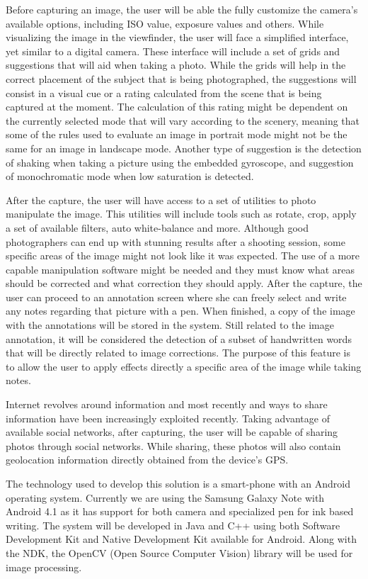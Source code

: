 Before capturing an image, the user will be able the fully customize the camera's available options, including ISO value, exposure values and others. While visualizing the image in the viewfinder, the user will face a simplified interface, yet similar to a digital camera. 
These interface will include a set of grids and suggestions that will aid when taking a photo. While the grids will help in the correct placement of the subject that is being photographed, the suggestions will consist in a visual cue or a rating calculated from the scene that is being captured at the moment. 
The calculation of this rating might be dependent on the currently selected mode that will vary according to the scenery, meaning that some of the rules used to evaluate an image in portrait mode might not be the same for an image in landscape mode. Another type of suggestion is the detection of shaking when taking a picture using the embedded gyroscope, and suggestion of monochromatic mode when low saturation is detected.

After the capture, the user will have access to a set of utilities to photo manipulate the image. This utilities will include tools such as rotate, crop, apply a set of available filters, auto white-balance and  more.
Although good photographers can end up with stunning results after a shooting session, some specific areas of the image might not look like it was expected. The use of a more capable manipulation software might be needed and they must know what areas should be corrected and what correction they should apply. After the capture, the user can proceed to an annotation screen where she can freely select and write any notes regarding that picture with a pen. When finished, a copy of the image with the annotations will be stored in the system. Still related to the image annotation, it will be considered the detection of a subset of handwritten words that will be directly related to image corrections. The purpose of this feature is to allow the user to apply effects directly a specific area of the image while taking notes.

Internet revolves around information and most recently and ways to share information have been increasingly exploited recently. Taking advantage of available social networks, after capturing, the user will be capable of sharing photos through social networks. While sharing, these photos will also contain geolocation information directly obtained from the device's GPS.

The technology used to develop this solution is a smart-phone with an Android operating system. Currently we are using the Samsung Galaxy Note with Android 4.1 as it has support for both camera and specialized pen for ink based writing. The system will be developed in Java and C++ using both Software Development Kit \cite{SDK} and Native Development Kit \cite{NDK} available for Android.  Along with the NDK, the OpenCV (Open Source Computer Vision) \cite{OCV} library will be used for image processing.

